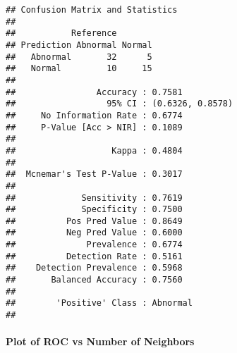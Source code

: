 \documentclass[
]{article}
\newenvironment{Shaded}{\begin{snugshade}}{\end{snugshade}}
\newcommand{\DataTypeTok}[1]{\textcolor[rgb]{0.13,0.29,0.53}{#1}}
\newcommand{\DecValTok}[1]{\textcolor[rgb]{0.00,0.00,0.81}{#1}}
\newcommand{\KeywordTok}[1]{\textcolor[rgb]{0.13,0.29,0.53}{\textbf{#1}}}
\newcommand{\NormalTok}[1]{#1}
\newcommand{\OperatorTok}[1]{\textcolor[rgb]{0.81,0.36,0.00}{\textbf{#1}}}
\newcommand{\StringTok}[1]{\textcolor[rgb]{0.31,0.60,0.02}{#1}}
\begin{document}
\begin{Shaded}
\end{Shaded}

\begin{verbatim}
## Confusion Matrix and Statistics
## 
##           Reference
## Prediction Abnormal Normal
##   Abnormal       32      5
##   Normal         10     15
##                                           
##                Accuracy : 0.7581          
##                  95% CI : (0.6326, 0.8578)
##     No Information Rate : 0.6774          
##     P-Value [Acc > NIR] : 0.1089          
##                                           
##                   Kappa : 0.4804          
##                                           
##  Mcnemar's Test P-Value : 0.3017          
##                                           
##             Sensitivity : 0.7619          
##             Specificity : 0.7500          
##          Pos Pred Value : 0.8649          
##          Neg Pred Value : 0.6000          
##              Prevalence : 0.6774          
##          Detection Rate : 0.5161          
##    Detection Prevalence : 0.5968          
##       Balanced Accuracy : 0.7560          
##                                           
##        'Positive' Class : Abnormal        
## 
\end{verbatim}

\hypertarget{plot-of-roc-vs-number-of-neighbors-1}{%
\paragraph{Plot of ROC vs Number of
Neighbors}\label{plot-of-roc-vs-number-of-neighbors-1}}
\end{document}
